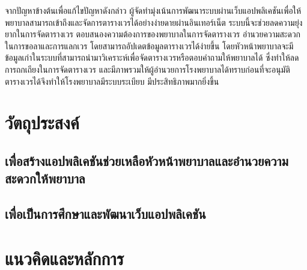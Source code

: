 จากปัญหาข้างต้นเพื่อแก้ไขปัญหาดังกล่าว ผู้จัดทำมุ่งเน้นการพัฒนาระบบผ่านเว็บแอปพลิเคชันเพื่อให้พยาบาลสามารถเข้าถึงและจัดการตารางเวรได้อย่างง่ายดายผ่านอินเทอร์เน็ต ระบบนี้จะช่วยลดความยุ่งยากในการจัดตารางเวร ตอบสนองความต้องการของพยาบาลในการจัดตารางเวร อำนวยความสะดวกในการขอลาและการแลกเวร โดยสามารถอัปเดตข้อมูลตารางเวรได้ง่ายขึ้น โดยหัวหน้าพยาบาลจะมีข้อมูลเก่าในระบบที่สามารถนำมาวิเคราะห์เพื่อจัดตารางเวรหรือตอบคำถามให้พยาบาลได้ ซึ่งทำให้ลดการถกเถียงในการจัดตารางเวร และมีภาพรวมให้ผู้อำนวยการโรงพยาบาลได้ทราบก่อนที่จะอนุมัติตารางเวรได้จึงทำให้โรงพยาบาลมีระบบระเบียบ มีประสิทธิภาพมากยิ่งขึ้น

\section{วัตถุประสงค์}

\hspace{0cm}\subsection{เพื่อสร้างแอปพลิเคชันช่วยเหลือหัวหน้าพยาบาลและอำนวยความสะดวกให้พยาบาล}

\hspace{0cm}\subsection{เพื่อเป็นการศึกษาและพัฒนาเว็บแอปพลิเคชัน}

\section{แนวคิดและหลักการ}